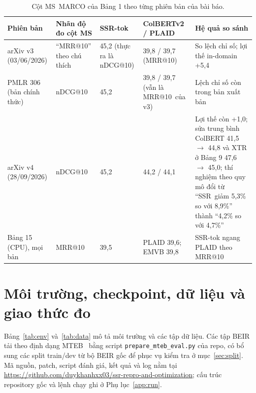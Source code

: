 \documentclass[a4paper,13pt]{extreport}
\makeatletter
\newcommand{\RepoNhom}{https://github.com/duykhanhxx03/ssr-repro-and-optimization}
\theoremstyle{plain}
\newcommand{\ssr}{SSR}
\newcommand{\ndcg}{nDCG@10}
\newcommand{\mrr}{MRR@10}
\makeatother
\begin{document}
\begin{table}[htbp]
\centering
\caption{Cột MS~MARCO của Bảng 1 theo từng phiên bản của bài báo.}
\label{tab:versions}
\footnotesize
\begin{tabular}{P{2.5cm}P{2.2cm}P{2.1cm}P{2.6cm}P{4.0cm}}
\toprule
\textbf{Phiên bản} & \textbf{Nhãn độ đo cột MS} & \textbf{\ssr-tok} & \textbf{ColBERTv2 / PLAID} & \textbf{Hệ quả so sánh}\\
\midrule
arXiv v3 (03/06/2026) & ``\mrr'' theo chú thích & 45,2 (thực ra là \ndcg) & 39,8 / 39,7 (\mrr) & So lệch chỉ số; lợi thế in-domain +5,4\\
PMLR 306 (bản chính thức) & \ndcg & 45,2 & 39,8 / 39,7 (vẫn là \mrr\ của v3) & Lệch chỉ số còn trong bản xuất bản\\
arXiv v4 (28/09/2026) & \ndcg & 45,2 & 44,2 / 44,1 & Lợi thế còn +1,0; sửa trung bình ColBERT 41,5 $\to$ 44,8 và XTR ở Bảng 9 47,6 $\to$ 45,0; thí nghiệm theo quy mô đổi từ ``\ssr\ giảm 5,3\% so với 8,9\%'' thành ``4,2\% so với 4,7\%''\\
Bảng 15 (CPU), mọi bản & \mrr & 39,5 & PLAID 39,6; EMVB 39,8 & \ssr-tok ngang PLAID theo \mrr\\
\bottomrule
\end{tabular}
\end{table}

\section{Môi trường, checkpoint, dữ liệu và giao thức đo}
\label{sec:setup}
Bảng~\ref{tab:env} và~\ref{tab:data} mô tả môi trường và các tập dữ liệu. Các tập BEIR tải theo định dạng MTEB~\cite{muennighoff2022} bằng script \texttt{prepare\_mteb\_eval.py} của repo, có bổ sung các split train/dev từ bộ BEIR gốc để phục vụ kiểm tra ở mục~\ref{sec:split}. Mã nguồn, patch, script đánh giá, kết quả và log nằm tại \url{\RepoNhom}; cấu trúc repository gốc và lệnh chạy ghi ở Phụ lục~\ref{app:run}.
\end{document}
